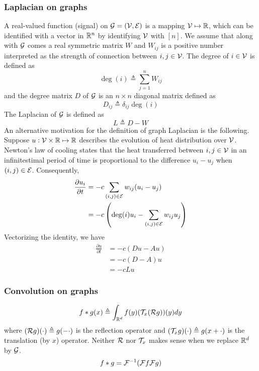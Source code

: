 \documentclass{article}
\DeclareMathOperator{\deg}{deg}
\newcommand{\pp}[2]{{\frac{\partial {#1}}{\partial {#2}}}}
\begin{document}
\subsubsection{Laplacian on graphs}

A real-valued function (signal) on ${\mathcal G} = ({\mathcal V}, {\mathcal E})$ is a mapping ${\mathcal V} \mapsto {\mathbb R}$, which can be identified with a vector in ${\mathbb R}^n$ by identifying ${\mathcal V}$ with $[n]$.
We assume that along with ${\mathcal G}$ comes a real symmetric matrix $W$ and $W_{i j}$ is a positive number interpreted as the strength of connection between $i, j \in {\mathcal V}$.
The degree of $i \in {\mathcal V}$ is defined as
\[
\deg (i) \triangleq \sum_{j = 1}^n W_{i j}
\]
and the degree matrix $D$ of ${\mathcal G}$ is an $n \times n$ diagonal matrix defined as
\[
D_{i j} \triangleq \delta_{i j} \deg (i)
\]
The Laplacian of ${\mathcal G}$ is defined as
\[
L \triangleq D - W
\]
An alternative motivation for the definition of graph Laplacian is the following.
Suppose $u: {\mathcal V} \times {\mathbb R} \mapsto {\mathbb R}$ describes the evolution of heat distribution over ${\mathcal V}$.
Newton's law of cooling states that the heat transferred between $i, j \in {\mathcal V}$ in an infinitestimal period of time is proportional to the difference $u_i - u_j$ when $(i, j) \in {\mathcal E}$.
Consequently,
\begin{align*}
\pp{u_i}{t}
& = -c \sum_{(i, j) \in \cale} w_{i j} (u_i - u_j) \\
& = -c \left(\deg (i) u_i - \sum_{(i, j) \in \cale} w_{i j} u_j\right)
\end{align*}
Vectorizing the identity, we have
\begin{align*}
\pp{u}{t}
& = -c (D u - A u) \\
& = -c (D - A) u \\
& = -c L u
\end{align*}

\subsubsection{Convolution on graphs}

\begin{equation*}
f * g (x) \triangleq \int_{{\mathbb R}^d} f(y) ({\mathcal T}_x ({\mathcal R} g)) (y) dy
\end{equation*}
where $({\mathcal R} g) (\cdot) \triangleq g(-\cdot)$ is the reflection operator and $({\mathcal T}_x g) (\cdot) \triangleq g(x + \cdot)$ is the translation (by $x$) operator.
Neither ${\mathcal R}$ nor ${\mathcal T}_x$ makes sense when we replace ${\mathbb R}^d$ by ${\mathcal G}$.
\begin{equation*}
f * g = {\mathcal F}^{-1} ({\mathcal F}  f {\mathcal F} g)
\end{equation*}
\end{document}
